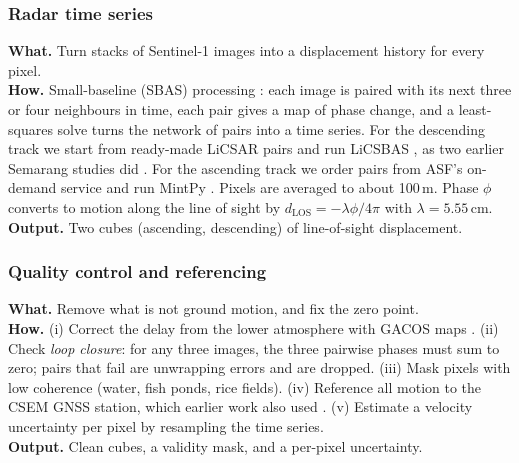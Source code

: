 \subsubsection{ Radar time series}
\textbf{What.} Turn stacks of Sentinel-1 images into a displacement history for every pixel.\\
\textbf{How.} Small-baseline (SBAS) processing \cite{berardino2002}: each image is paired with its
next three or four neighbours in time, each pair gives a map of phase change, and a least-squares
solve turns the network of pairs into a time series. For the descending track we start from
ready-made LiCSAR pairs and run LiCSBAS \cite{morishita2020}, as two earlier Semarang studies did
\cite{lo2022,azeriansyah2025}. For the ascending track we order pairs from ASF's on-demand service
and run MintPy \cite{yunjun2019}. Pixels are averaged to about 100\,m. Phase $\phi$ converts to motion
along the line of sight by $d_{\mathrm{LOS}} = -\lambda\phi/4\pi$ with $\lambda = 5.55$\,cm.\\
\textbf{Output.} Two cubes (ascending, descending) of line-of-sight displacement.

\subsubsection{ Quality control and referencing}
\textbf{What.} Remove what is not ground motion, and fix the zero point.\\
\textbf{How.} (i) Correct the delay from the lower atmosphere with GACOS maps \cite{yu2018}.
(ii) Check \emph{loop closure}: for any three images, the three pairwise phases must sum to zero;
pairs that fail are unwrapping errors and are dropped. (iii) Mask pixels with low coherence
(water, fish ponds, rice fields). (iv) Reference all motion to the CSEM GNSS station, which earlier
work also used \cite{azeriansyah2025}. (v) Estimate a velocity uncertainty per pixel by resampling
the time series.\\
\textbf{Output.} Clean cubes, a validity mask, and a per-pixel uncertainty.

